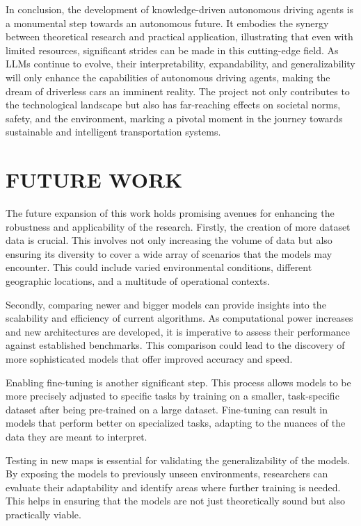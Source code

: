 \begin{spacing}{1.5}
\begin{sloppypar}
In conclusion, the development of knowledge-driven autonomous driving agents is a monumental step towards an autonomous future. It embodies the synergy between theoretical research and practical application, illustrating that even with limited resources, significant strides can be made in this cutting-edge field. As LLMs continue to evolve, their interpretability, expandability, and generalizability will only enhance the capabilities of autonomous driving agents, making the dream of driverless cars an imminent reality. The project not only contributes to the technological landscape but also has far-reaching effects on societal norms, safety, and the environment, marking a pivotal moment in the journey towards sustainable and intelligent transportation systems.
\section{\uppercase{FUTURE WORK}}
The future expansion of this work holds promising avenues for enhancing the robustness and applicability of the research. Firstly, the creation of more dataset data is crucial. This involves not only increasing the volume of data but also ensuring its diversity to cover a wide array of scenarios that the models may encounter. This could include varied environmental conditions, different geographic locations, and a multitude of operational contexts. 

Secondly, comparing newer and bigger models can provide insights into the scalability and efficiency of current algorithms. As computational power increases and new architectures are developed, it is imperative to assess their performance against established benchmarks. This comparison could lead to the discovery of more sophisticated models that offer improved accuracy and speed.

Enabling fine-tuning is another significant step. This process allows models to be more precisely adjusted to specific tasks by training on a smaller, task-specific dataset after being pre-trained on a large dataset. Fine-tuning can result in models that perform better on specialized tasks, adapting to the nuances of the data they are meant to interpret.

Testing in new maps is essential for validating the generalizability of the models. By exposing the models to previously unseen environments, researchers can evaluate their adaptability and identify areas where further training is needed. This helps in ensuring that the models are not just theoretically sound but also practically viable.


\end{sloppypar}
\end{spacing}
